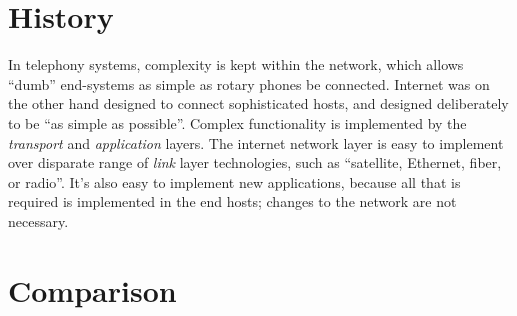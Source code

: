 \documentclass[10pt]{report}
\begin{document}
\section{History}

In telephony systems, complexity is kept within the network, which allows
``dumb'' end-systems as simple as rotary phones be connected.  Internet was on
the other hand designed to connect sophisticated hosts, and designed
deliberately to be ``as simple as possible''.  Complex functionality is
implemented by the {\em transport} and {\em application} layers.  The internet
network layer is easy to implement over disparate range of {\em link} layer
technologies, such as ``satellite, Ethernet, fiber, or radio''.  It's also easy
to implement new applications, because all that is required is implemented in
the end hosts; changes to the network are not necessary.
\cite[pp349--351]{kurose}

\section{Comparison}
\end{document}
